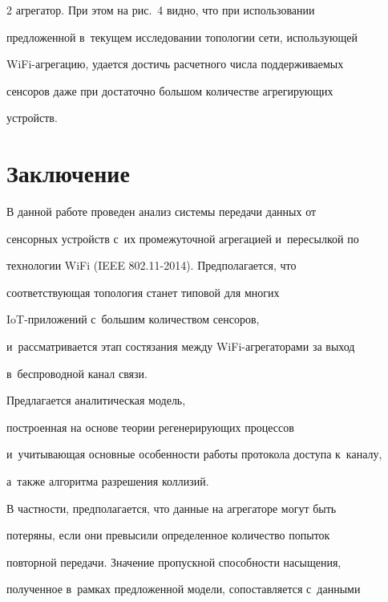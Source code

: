 \begin{multicols}{2}
агрегатор. При этом на рис.~4 видно, что при использовании 


предложенной в~текущем исследовании топологии сети, использующей 


WiFi-агре\-га\-цию, удается достичь расчетного числа поддерживаемых 


сенсоров даже при достаточно большом количестве агрегирующих 


устройств.








   


 \section{Заключение}


     


    В данной работе проведен анализ системы передачи данных от 


сенсорных устройств с~их промежуточной агрегацией и~пересылкой по 


технологии WiFi (IEEE 802.11-2014). Предполагается, что 


соответствующая топология станет типовой для многих  


IoT-при\-ло\-же\-ний с~большим количеством сенсоров, 


и~рассматривается этап состязания между WiFi-аг\-ре\-га\-то\-ра\-ми за выход 


в~беспроводной канал связи. 





Предлагается аналитическая модель, 


построенная на основе теории регенерирующих процессов 


и~учитывающая основные особенности работы протокола доступа к~каналу, 


а~также алгоритма разрешения коллизий. 




    В частности, предполагается, что данные на агрегаторе могут быть 


потеряны, если они превысили определенное количество попыток 


повторной передачи. Значение пропускной способности насыщения, 


полученное в~рамках предложенной модели, сопоставляется с~данными 



\end{multicols}
